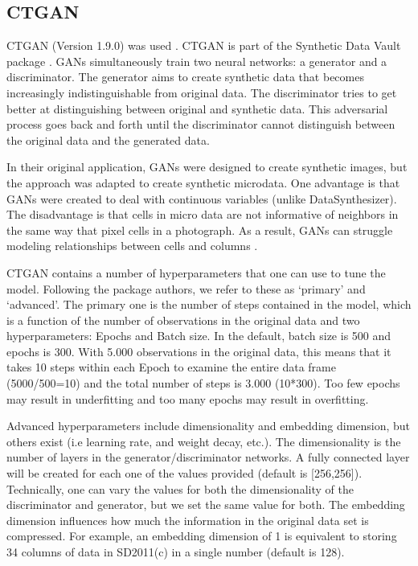 \documentclass[runningheads]{llncs}
\begin{document}
\subsection{CTGAN} 

CTGAN (Version 1.9.0) was used \cite{ctgan}.  CTGAN is part of the Synthetic Data Vault package \cite{patki2016synthetic}.  GANs \cite{goodfellow2014generative} simultaneously train two neural networks: a generator and a discriminator. The generator aims to create synthetic data that becomes increasingly indistinguishable from original data.  The discriminator tries to get better at distinguishing between original and synthetic data.  This adversarial process goes back and forth until the discriminator cannot distinguish between the original data and the generated data.  

In their original application, GANs were designed to create synthetic images, but the approach was adapted to create synthetic microdata.  One advantage is that GANs were created to deal with continuous variables (unlike DataSynthesizer).  The disadvantage is that cells in micro data are not informative of neighbors in the same way that pixel cells in a photograph. As a result, GANs can struggle modeling relationships between cells and columns \cite{drechsler202330}.

CTGAN contains a number of hyperparameters that one can use to tune the model. Following the package authors, we refer to these as `primary' and `advanced'.  The primary one is the number of steps contained in the model, which is a function of the number of observations in the original data and two hyperparameters: Epochs and Batch size.  In the default, batch size is 500 and epochs is 300.  With 5.000 observations in the original data, this means that it takes 10 steps within each Epoch to examine the entire data frame (5000/500=10) and the total number of steps is 3.000 (10*300).  Too few epochs may result in underfitting and too many epochs may result in overfitting.

Advanced hyperparameters include dimensionality and embedding dimension, but others exist (i.e learning rate, and weight decay, etc.).  The dimensionality is the number of layers in the generator/discriminator networks.  A fully connected layer will be created for each one of the values provided (default is [256,256]).  Technically, one can vary the values for both the dimensionality of the discriminator and generator, but we set the same value for both.  The embedding dimension influences how much the information in the original data set is compressed.  For example, an embedding dimension of 1 is equivalent to storing 34 columns of data in SD2011(c) in a single number (default is 128).
\end{document}
